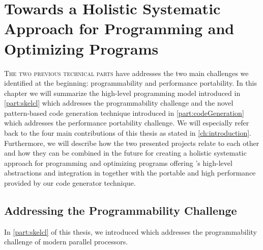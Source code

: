
\chapter[Towards a Holistic Systematic Approach for\\ Programming and Optimizing Programs]{Towards a Holistic Systematic Approach for Programming and Optimizing Programs}

\label{ch:seventh} %

\lettrine[lines=3, loversize=0.1]{T}{he two previous technical parts} have addresses the two main challenges we identified at the beginning: programmability and performance portability.
In this chapter we will summarize \SkelCL the high-level programming model introduced in \autoref{part:skelcl} which addresses the programmability challenge and the novel pattern-based code generation technique introduced in \autoref{part:codeGeneration} which addresses the performance portability challenge.
We will especially refer back to the four main contributions of this thesis as stated in \autoref{ch:introduction}.
Furthermore, we will describe how the two presented projects relate to each other and how they can be combined in the future for creating a holistic systematic approach for programming and optimizing programs offering \SkelCL's high-level abstractions and integration in \Cpp together with the portable and high performance provided by our code generator technique.

\section{Addressing the Programmability Challenge}

In \autoref{part:skelcl} of this thesis, we introduced \SkelCL which addresses the programmability challenge of modern parallel processors.

